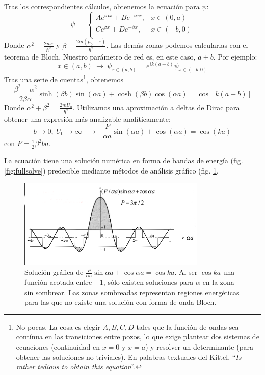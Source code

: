 Tras los correspondientes cálculos, obtenemos la ecuación para $\psi$:
\begin{equation}
  \psi = \
  \begin{cases}
    A e^{i\alpha x} + B e^{-i\alpha x} , &x\in(0,a) \\
    C e^{ \beta x} + D e^{- \beta x} , &x\in(-b,0) \\
  \end{cases}
\end{equation}
Donde $\alpha^2 = \frac{2m\varepsilon}{\hbar^2}$ y $\beta =
\frac{2m(\mu_0 - \varepsilon)}{\hbar^2}$.
Las demás zonas podemos calcularlas con el teorema de Bloch. Nuestro
parámetro de red es, en este caso, $a+b$. Por ejemplo:
\begin{equation}
  x\in(a,b) \ \rightarrow \ \psi_{x \in (a,b)} = e^{ik(a+b)}\psi_{x \in ({-b},0)}
\end{equation}
Tras una serie de cuentas\footnote{No pocas. La cosa es elegir
  $A,B,C,D$ tales que la función de ondas sea contínua en las
  transiciones entre pozos, lo que exige plantear dos sistemas de
  ecuaciones (continuidad en $x=0$ y $x=a$) y resolver un determinante
  (para obtener las soluciones no triviales). En palabras textuales
  del Kittel, ``\emph{Is rather tedious to obtain this equation}''.}, obtenemos
\begin{equation}
  \frac{\beta^2 -\alpha^2}{2 \beta \alpha } \sinh(\beta b) \sin(\alpha
  a) + \cosh(\beta b)\cos(\alpha a) = \cos[k(a+b)]
\end{equation}
Donde $\alpha^2 + \beta^2 = \frac{2m U_0}{\hbar^2}$. Utilizamos una
aproximación a deltas de Dirac para obtener una expresión más
analizable analíticamente:
\begin{equation}
  b\to0, \ U_0 \to \infty \ \ \ \rightarrow \ \ \ \frac{P}{\alpha a}
  \sin(\alpha a) + \cos (\alpha a) = \cos(ka)
\end{equation}
con $P = \frac{1}{2} \beta^2 b a$.

La ecuación tiene una solución numérica en forma de bandas de energía
(fig. \ref{fig:fullsolve}) predecible mediante métodos de análisis
gráfico (fig. \ref{fig:graphicsolve}.

\begin{figure}
  \centering
  \includegraphics[width=0.8\textwidth]{figures/graphicsolve.png}
  \caption{Solución gráfica de
    $ \frac{P}{\alpha a} \sin \alpha a + \cos \alpha a = \cos ka$. Al
    ser $\cos ka$ una función acotada entre $\pm 1$, sólo existen
    soluciones para $\alpha$ en la zona sin sombrear. Las zonas
    sombreadas representan regiones energéticas para las que no existe
    una solución con forma de onda Bloch.}
  \label{fig:graphicsolve}
\end{figure}

